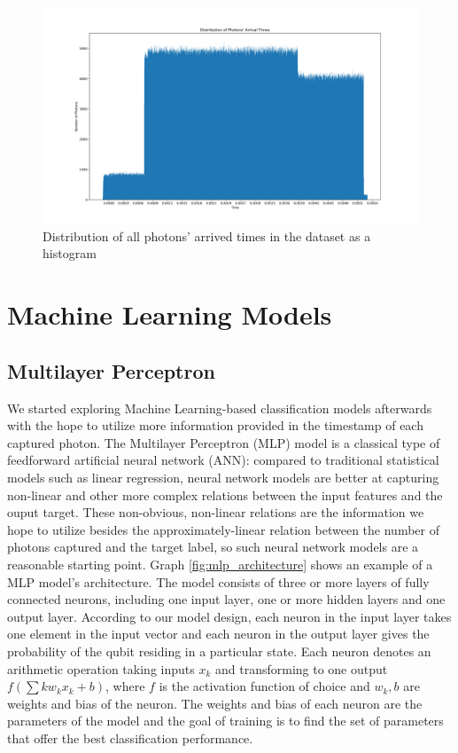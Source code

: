 \documentclass[letterpaper,twocolumn,10pt]{article}
\begin{document}
\begin{figure}
    \includegraphics[width=\linewidth]{Figures/distro_photons_arrival_times.png}
    \centering
    \caption{Distribution of all photons' arrived times in the dataset as a histogram}
    \label{fig:distro_photons_arrival_times}
\end{figure}

\section{Machine Learning Models}

\subsection{Multilayer Perceptron}

We started exploring Machine Learning-based classification models afterwards with the hope to utilize more information provided in the timestamp of each captured photon. The Multilayer Perceptron (MLP) model is a classical type of feedforward artificial neural network (ANN): compared to traditional statistical models such as linear regression, neural network models are better at capturing non-linear and other more complex relations between the input features and the ouput target. These non-obvious, non-linear relations are the information we hope to utilize besides the approximately-linear relation between the number of photons captured and the target label, so such neural network models are a reasonable starting point. Graph \ref{fig:mlp_architecture} shows an example of a MLP model's architecture. The model consists of three or more layers of fully connected neurons, including one input layer, one or more hidden layers and one output layer. According to our model design, each neuron in the input layer takes one element in the input vector and each neuron in the output layer gives the probability of the qubit residing in a particular state. Each neuron denotes an arithmetic operation taking inputs $x_k$ and transforming to one output $f(\sum{k}{w_k}{x_k} + b)$, where $f$ is the activation function of choice and $w_k, b$ are weights and bias of the neuron. The weights and bias of each neuron are the parameters of the model and the goal of training is to find the set of parameters that offer the best classification performance.
\end{document}

